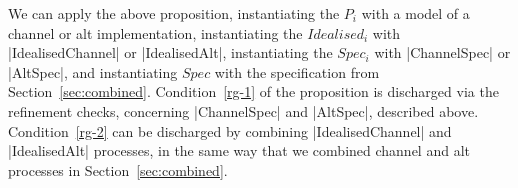 We can apply the above proposition, instantiating the $P_i$ with a model of a
channel or alt implementation, instantiating the $Idealised_i$ with
|IdealisedChannel| or |IdealisedAlt|, instantiating the $Spec_i$ with
|ChannelSpec| or |AltSpec|, and instantiating $Spec$ with the specification
from Section~\ref{sec:combined}.  Condition~\ref{rg-1} of the proposition is
discharged via the refinement checks, concerning |ChannelSpec| and |AltSpec|,
described above.  Condition~\ref{rg-2} can be discharged by combining
|IdealisedChannel| and |IdealisedAlt| processes, in the same way that we
combined channel and alt processes in Section~\ref{sec:combined}.




